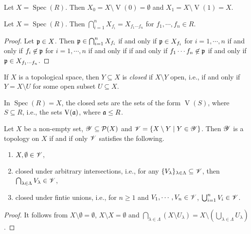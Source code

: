 \begin{fact}
    Let $X = \operatorname{Spec}(R)$. Then $X_0 = X \setminus \operatorname{V}(0) = \emptyset$ and $X_1 = X \setminus \operatorname{V}(1) = X$.
\end{fact}

\begin{proposition}
    Let $X = \operatorname{Spec}(R)$. Then $\bigcap_{i=1}^n X_{f_i} = X_{f_1 \cdots f_n}$ for $f_1,\cdots,f_n \in R$.
\end{proposition}

\begin{proof}
    Let $\mathfrak{p} \in X$. Then $\mathfrak{p} \in \bigcap_{i=1}^n X_{f_i}$ if and only if $\mathfrak{p} \in X_{f_i}$ for $i = 1,\cdots,n$ if and only if $f_i \not \in \mathfrak{p}$ for $i = 1,\cdots,n$ if and only if if and only if $f_1 \cdots f_n \not \in \mathfrak{p}$ if and only if $\mathfrak{p} \in X_{f_1 \cdots f_n}$.
\end{proof}

\begin{definition}
    If $X$ is a topological space, then $Y \subseteq X$ is \emph{closed} if $X \setminus Y$ open, i.e., if and only if $Y = X \setminus U$ for some open subset $U \subseteq X$.
\end{definition}

\begin{example}
    In $\operatorname{Spec}(R) = X$, the closed sets are the sets of the form $\operatorname{V}(S)$, where $S \subseteq R$, i.e., the sets $\operatorname{V}(\mathfrak{a})$, where $\mathfrak{a} \leq R$.
\end{example}

\begin{proposition}
    Let $X$ be a non-empty set, $\mathscr{Y} \subseteq \mathcal{P}(X)$ and $\mathscr{V} = \{X \setminus Y \mid Y \in \mathscr{Y}\}$. Then $\mathscr{Y}$ is a topology on $X$ if and if only $\mathscr{V}$ satisfies the following.
    \begin{enumerate}
        \item $X,\emptyset \in \mathscr{V}$,
        \item closed under arbitrary intersections, i.e., for any $\{V_\lambda\}_{\lambda \in \Lambda} \subseteq \mathscr{V}$, then $\bigcap_{\lambda \in \Lambda} V_\lambda \in \mathscr{V}$,
        \item closed under fintie unions, i.e., for $n \geq 1$ and $V_1,\cdots,V_n \in \mathscr{V}$, $\bigcup_{i=1}^n V_i \in \mathscr{V}$.
    \end{enumerate}
\end{proposition}

\begin{proof}
    It follows from $X \setminus \emptyset = \emptyset$, $X \setminus X = \emptyset$ and $\bigcap_{\lambda \in \Lambda} (X \setminus U_\lambda) = X \setminus (\bigcup_{\lambda \in \Lambda} U_\lambda)$.
\end{proof}

